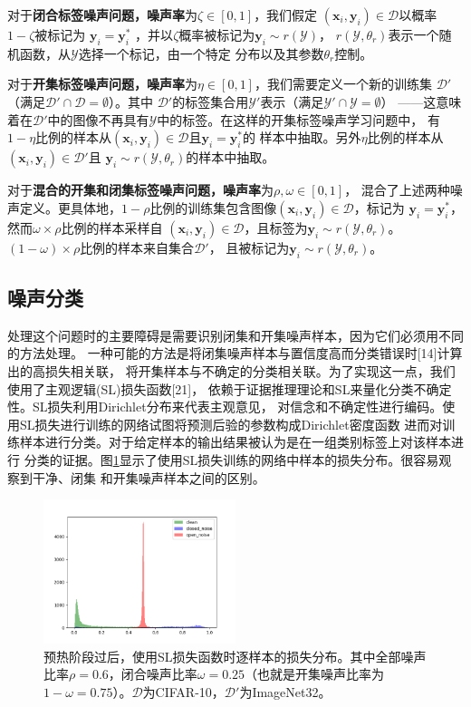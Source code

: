 \documentclass[11pt]{article}
\begin{document}
对于\textbf{闭合标签噪声问题，噪声率}为$\zeta \in [0,1]$，我们假定
$(\mathbf{x}_i,\mathbf{y}_i) \in \mathcal{D}$以概率$1-\zeta$被标记为
$\mathbf{y}_i = \mathbf{y}^*_i$ ，并以$\zeta$概率被标记为$\mathbf{y}_i \sim r(\mathcal{Y})$，
$r(\mathcal{Y},\theta_r)$表示一个随机函数，从$\mathcal{Y}$选择一个标记，由一个特定
分布以及其参数$\theta_r$控制。

对于\textbf{开集标签噪声问题，噪声率}为$\eta \in [0,1]$，我们需要定义一个新的训练集
$\mathcal{D'}$（满足$\mathcal{D'} \cap \mathcal{D} = \emptyset$）。其中
$\mathcal{D'}$的标签集合用$\mathcal{Y'}$表示（满足$\mathcal{Y'} \cap \mathcal{Y} = \emptyset$）
——这意味着在$\mathcal{D'}$中的图像不再具有$\mathcal{Y}$中的标签。在这样的开集标签噪声学习问题中，
有$1-\eta$比例的样本从$(\mathbf{x}_i,\mathbf{y}_i) \in \mathcal{D}$且$\mathbf{y}_i=\mathbf{y}^{*}_i$的
样本中抽取。另外$\eta$比例的样本从$(\mathbf{x}_i,\mathbf{y}_i) \in \mathcal{D}'$且
$\mathbf{y}_i  \sim r(\mathcal{Y},\theta_r)$的样本中抽取。

对于\textbf{混合的开集和闭集标签噪声问题，噪声率}为$\rho,\omega \in [0,1]$，
混合了上述两种噪声定义。更具体地，$1 - \rho$比例的训练集包含图像$(\mathbf{x}_i,\mathbf{y}_i) \in \mathcal{D}$，标记为
$\mathbf{y}_i = \mathbf{y}_i^{*}$，然而$\omega \times \rho$比例的样本采样自
$(\mathbf{x}_i,\mathbf{y}_i) \in \mathcal{D}$，且标签为$\mathbf{y}_i  \sim r(\mathcal{Y},\theta_r)$。
$(1 - \omega) \times \rho$比例的样本来自集合$\mathcal{D}'$，
且被标记为$\mathbf{y}_i  \sim r(\mathcal{Y},\theta_r)$。

\subsection{噪声分类}
处理这个问题时的主要障碍是需要识别闭集和开集噪声样本，因为它们必须用不同的方法处理。
一种可能的方法是将闭集噪声样本与置信度高而分类错误时[14]计算出的高损失相关联，
将开集样本与不确定的分类相关联。为了实现这一点，我们使用了主观逻辑(SL)损失函数[21]，
依赖于证据推理理论和SL来量化分类不确定性。SL损失利用Dirichlet分布来代表主观意见，
对信念和不确定性进行编码。使用SL损失进行训练的网络试图将预测后验的参数构成Dirichlet密度函数
进而对训练样本进行分类。对于给定样本的输出结果被认为是在一组类别标签上对该样本进行
分类的证据。图\ref{fig3}显示了使用SL损失训练的网络中样本的损失分布。很容易观察到干净、闭集
和开集噪声样本之间的区别。
\begin{figure}[h]
    \centering
    \includegraphics[width=0.5\textwidth]{images/textbook.png}
    \caption{预热阶段过后，使用SL损失函数时逐样本的损失分布。其中全部噪声比率$\rho = 0.6$，闭合噪声比率$\omega = 0.25$（也就是开集噪声比率为$1-\omega = 0.75$）。$\mathcal{D}$为CIFAR-10，$\mathcal{D}'$为ImageNet32。}
    \label{fig3}
\end{figure}
\end{document}
